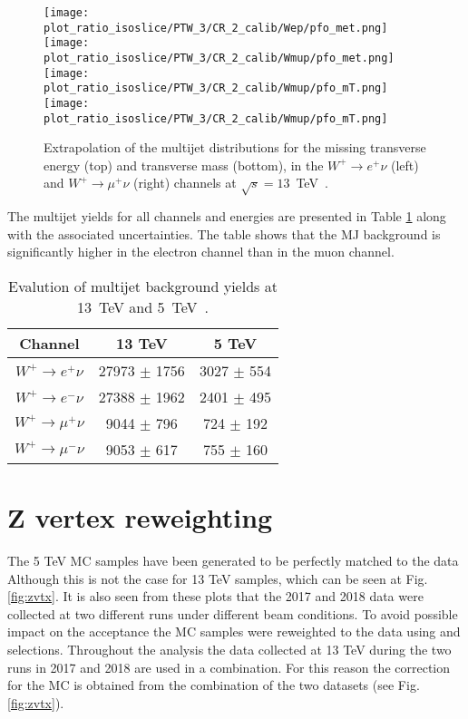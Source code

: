 \begin{figure}[htbp]
	\texttt{[image: plot\_ratio\_isoslice/PTW\_3/CR\_2\_calib/Wep/pfo\_met.png]}
	\texttt{[image: plot\_ratio\_isoslice/PTW\_3/CR\_2\_calib/Wmup/pfo\_met.png]}\\
	\texttt{[image: plot\_ratio\_isoslice/PTW\_3/CR\_2\_calib/Wmup/pfo\_mT.png]}
	\texttt{[image: plot\_ratio\_isoslice/PTW\_3/CR\_2\_calib/Wmup/pfo\_mT.png]}\\
	\caption{Extrapolation of the multijet distributions for the missing transverse energy (top) and transverse mass (bottom), in the $W^+\to e^+\nu$ (left) and $W^+\to \mu^+\nu$ (right) channels at $\sqrt{s}=13$~TeV~\cite{mjets_int_note_6}.}
	\label{fig:mjbkg-shape}
\end{figure}
The multijet yields for all channels and energies are presented in Table \ref{table:mj_summary} along with the associated uncertainties. The table shows that the MJ background is significantly higher in the electron channel than in the muon channel. 
\begin{table}[h!]
	\begin{center}
		\begin{tabular}{|c|c|c|}
			\hline
			Channel & 13 TeV & 5 TeV \\
			\hline
			$W^+\to e^{+}\nu$ & 27973 $\pm$ 1756 &  3027 $\pm$ 554 \\
			$W^+\to e^{-}\nu$ & 27388 $\pm$ 1962 &  2401 $\pm$ 495 \\
			$W^+\to \mu^{+}\nu$ & 9044 $\pm$ 796 &  724 $\pm$ 192 \\
			$W^+\to \mu^{-}\nu$ & 9053 $\pm$ 617 & 755 $\pm$ 160 \\
			\hline
		\end{tabular}
		\caption{Evalution of multijet background yields at 13~TeV and 5~TeV~\cite{mjets_int_note_6}.}
		\label{table:mj_summary}
	\end{center}
\end{table}
\clearpage
     \section{Z vertex reweighting }
The 5 TeV MC samples have been generated to be perfectly matched to the data 
Although this is not the case for 13 TeV samples, which can be seen at Fig. \ref{fig:zvtx}. 
It is also seen from these plots that the 2017 and 2018 data were collected at two different runs under different beam conditions. 
To avoid possible impact on the acceptance the MC samples were reweighted to the data using \Zee and \Zmm selections. Throughout the analysis the data collected at 13 TeV during the two runs in 2017 and 2018 are used in a combination. For this reason the correction for the MC is obtained from the combination of the two datasets (see Fig. \ref{fig:zvtx}).  

